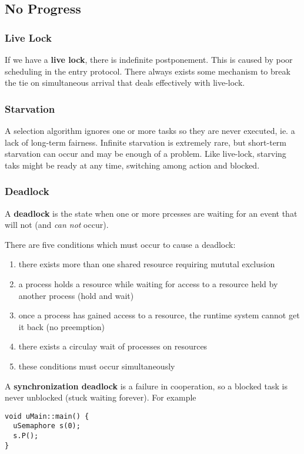 \documentclass[12pt]{article}
\begin{document}
\subsection{No Progress}
\subsubsection{Live Lock}
If we have a {\bf live lock}, there is indefinite postponement. This is caused by poor scheduling in the entry protocol. There always exists some mechanism to break the tie on simultaneous arrival that deals effectively with live-lock.

\subsubsection{Starvation}
A selection algorithm ignores one or more tasks so they are never executed, ie. a lack of long-term fairness. Infinite starvation is extremely rare, but short-term starvation can occur and may be enough of a problem. Like live-lock, starving taks might be ready at any time, switching among action and blocked.

\subsubsection{Deadlock}
A {\bf deadlock} is the state when one or more prcesses are waiting for an event that will not (and \textit{can not} occur).

There are five conditions which must occur to cause a deadlock:
\begin{enumerate}
\item there exists more than one shared resource requiring mututal exclusion
\item a process holds a resource while waiting for access to a resource held by another process (hold and wait)
\item once a process has gained access to a resource, the runtime system cannot get it back (no preemption)
\item there exists a circulay wait of processes on resources
\item these conditions must occur simultaneously
\end{enumerate}

A {\bf synchronization deadlock} is a failure in cooperation, so a blocked task is never unblocked (stuck waiting forever). For example
\begin{verbatim}
void uMain::main() {
  uSemaphore s(0);
  s.P();
}
\end{verbatim}
\end{document}
